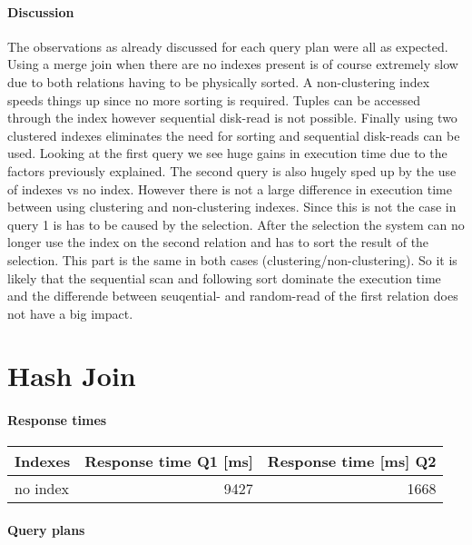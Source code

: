 \documentclass[11pt]{scrartcl}
\begin{document}
\paragraph{Discussion}
The observations as already discussed for each query plan were all as expected. Using a merge join when there are no indexes present is of course extremely slow due to both relations having to be physically sorted.
A non-clustering index speeds things up since no more sorting is required. Tuples can be accessed through the index however sequential disk-read is not possible.
Finally using two clustered indexes eliminates the need for sorting and sequential disk-reads can be used. Looking at the first query we see huge gains in execution time due to the factors previously explained.
The second query is also hugely sped up by the use of indexes vs no index. However there is not a large difference in execution time between using clustering and non-clustering indexes. Since this is not the case
in query 1 is has to be caused by the selection. After the selection the system can no longer use the index on the second relation and has to sort the result of the selection.
This part is the same in both cases (clustering/non-clustering). So it is likely that the sequential scan and following sort dominate the execution time and the differende between seuqential- and random-read of the first
relation does not have a big impact.

\section{Hash Join}

\paragraph{Response times}

\begin{flushleft}
\begin{tabular}{l|r|r}
  Indexes & Response time Q1 [ms] & Response time [ms] Q2 \\
  \hline
  no index & 9427 & 1668 \\
\end{tabular}
\end{flushleft}

\paragraph{Query plans}\mbox{}\\
\end{document}
